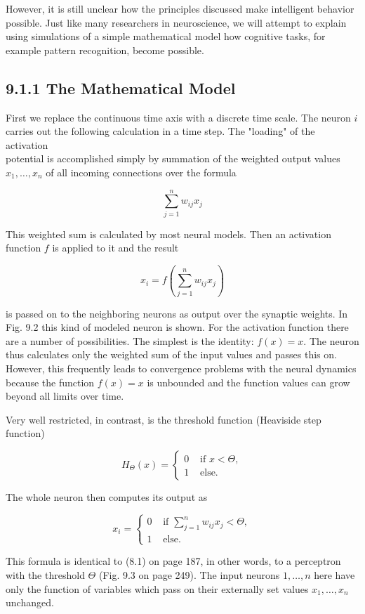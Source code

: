 \documentclass[10pt]{article}
\begin{document}
However, it is still unclear how the principles discussed make intelligent behavior possible. Just like many researchers in neuroscience, we will attempt to explain using simulations of a simple mathematical model how cognitive tasks, for example pattern recognition, become possible.

\subsection*{9.1.1 The Mathematical Model}
First we replace the continuous time axis with a discrete time scale. The neuron $i$ carries out the following calculation in a time step. The "loading" of the activation\\
potential is accomplished simply by summation of the weighted output values $x_{1}, \ldots, x_{n}$ of all incoming connections over the formula


$$
\sum_{j=1}^{n} w_{i j} x_{j}
$$

This weighted sum is calculated by most neural models. Then an activation function $f$ is applied to it and the result

$$
x_{i}=f\left(\sum_{j=1}^{n} w_{i j} x_{j}\right)
$$

is passed on to the neighboring neurons as output over the synaptic weights. In Fig. 9.2 this kind of modeled neuron is shown. For the activation function there are a number of possibilities. The simplest is the identity: $f(x)=x$. The neuron thus calculates only the weighted sum of the input values and passes this on. However, this frequently leads to convergence problems with the neural dynamics because the function $f(x)=x$ is unbounded and the function values can grow beyond all limits over time.

Very well restricted, in contrast, is the threshold function (Heaviside step function)

$$
H_{\Theta}(x)= \begin{cases}0 & \text { if } x<\Theta, \\ 1 & \text { else. }\end{cases}
$$

The whole neuron then computes its output as

$$
x_{i}= \begin{cases}0 & \text { if } \sum_{j=1}^{n} w_{i j} x_{j}<\Theta, \\ 1 & \text { else. }\end{cases}
$$

This formula is identical to (8.1) on page 187, in other words, to a perceptron with the threshold $\Theta$ (Fig. 9.3 on page 249). The input neurons $1, \ldots, n$ here have only the function of variables which pass on their externally set values $x_{1}, \ldots, x_{n}$ unchanged.
\end{document}
